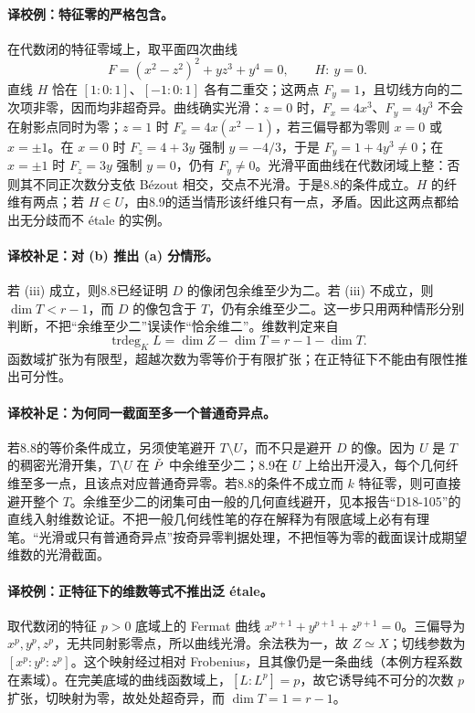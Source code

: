\paragraph{译校例：特征零的严格包含。}
在代数闭的特征零域上，取平面四次曲线
\[
 F=(x^2-z^2)^2+yz^3+y^4=0,
 \qquad H:\ y=0.
\]
直线 $H$ 恰在 $[1:0:1]$、$[-1:0:1]$ 各有二重交；这两点 $F_y=1$，且切线方向的二次项非零，因而均非超奇异。曲线确实光滑：$z=0$ 时，$F_x=4x^3$、$F_y=4y^3$ 不会在射影点同时为零；$z=1$ 时 $F_x=4x(x^2-1)$，若三偏导都为零则 $x=0$ 或 $x=\pm1$。在 $x=0$ 时 $F_z=4+3y$ 强制 $y=-4/3$，于是 $F_y=1+4y^3\ne0$；在 $x=\pm1$ 时 $F_z=3y$ 强制 $y=0$，仍有 $F_y\ne0$。光滑平面曲线在代数闭域上整：否则其不同正次数分支依 Bézout 相交，交点不光滑。于是8.8的条件成立。$H$ 的纤维有两点；若 $H\in U$，由8.9的适当情形该纤维只有一点，矛盾。因此这两点都给出无分歧而不 étale 的实例。

\paragraph{译校补足：对 (b) 推出 (a) 分情形。}
若 (iii) 成立，则8.8已经证明 $D$ 的像闭包余维至少为二。若 (iii) 不成立，则 $\dim T<r-1$，而 $D$ 的像包含于 $T$，仍有余维至少二。这一步只用两种情形分别判断，不把“余维至少二”误读作“恰余维二”。维数判定来自
\[
 \operatorname{trdeg}_K L=\dim Z-\dim T=r-1-\dim T.
\]
函数域扩张为有限型，超越次数为零等价于有限扩张；在正特征下不能由有限性推出可分性。

\paragraph{译校补足：为何同一截面至多一个普通奇异点。}
若8.8的等价条件成立，另须使笔避开 $T\setminus U$，而不只是避开 $D$ 的像。因为 $U$ 是 $T$ 的稠密光滑开集，$T\setminus U$ 在 $\check P$ 中余维至少二；8.9在 $U$ 上给出开浸入，每个几何纤维至多一点，且该点对应普通奇异零。若8.8的条件不成立而 $k$ 特征零，则可直接避开整个 $T$。余维至少二的闭集可由一般的几何直线避开，见本报告“D18-105”的直线入射维数论证。不把一般几何线性笔的存在解释为有限底域上必有有理笔。“光滑或只有普通奇异点”按奇异零判据处理，不把恒等为零的截面误计成期望维数的光滑截面。

\paragraph{译校例：正特征下的维数等式不推出泛 étale。}
取代数闭的特征 $p>0$ 底域上的 Fermat 曲线 $x^{p+1}+y^{p+1}+z^{p+1}=0$。三偏导为 $x^p,y^p,z^p$，无共同射影零点，所以曲线光滑。余法秩为一，故 $Z\simeq X$；切线参数为 $[x^p:y^p:z^p]$。这个映射经过相对 Frobenius，且其像仍是一条曲线（本例方程系数在素域）。在完美底域的曲线函数域上，$[L:L^p]=p$，故它诱导纯不可分的次数 $p$ 扩张，切映射为零，故处处超奇异，而 $\dim T=1=r-1$。

